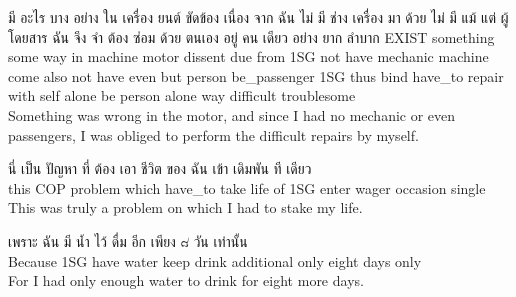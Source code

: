 \documentclass{book}
\begin{document}
	\begin{exe}
		\ex 
		\gll มี อะไร บาง อย่าง ใน เครื่อง ยนต์ ขัดข้อง เนื่อง จาก ฉัน ไม่ มี ช่าง เครื่อง มา ด้วย ไม่ มี แม้ แต่ ผู้ โดยสาร ฉัน จึง จำ ต้อง ซ่อม ด้วย ตนเอง อยู่ คน เดียว อย่าง ยาก ลำบาก
		\textsc{EXIST} something some way in machine motor dissent due from \textsc{1SG} not have mechanic machine come also not have even but person be\_passenger \textsc{1SG} thus bind have\_to repair with self alone be person alone way difficult troublesome\\
		Something was wrong in the motor, and since I had no mechanic or even passengers, I was obliged to perform the difficult repairs by myself.\\
	\end{exe}

	\begin{exe}
		\ex 
		\gll นี่ เป็น ปัญหา ที่ ต้อง เอา ชีวิต ของ ฉัน เข้า เดิมพัน ที เดียว\\
		this \textsc{COP} problem which have\_to take life of \textsc{1SG} enter wager occasion single\\
		This was truly a problem on which I had to stake my life.
	\end{exe}

	\begin{exe}
		\ex 
		\gll เพราะ ฉัน มี น้ำ ไว้ ดื่ม อีก เพียง ๘ วัน เท่านั้น\\
		Because \textsc{1SG} have water keep drink additional only eight days only\\
		For I had only enough water to drink for eight more days.
	\end{exe}
\end{document}
